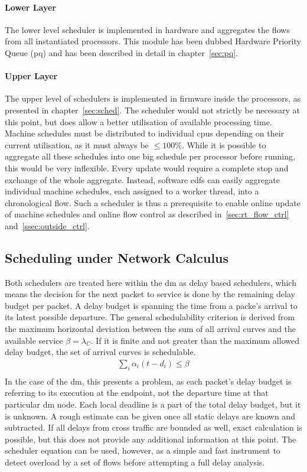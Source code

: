 \paragraph{Lower Layer}
The lower level scheduler is implemented in hardware and aggregates the flows from all instantiated processors.
This module has been dubbed Hardware Priority Queue (\gls{pq}) and has been described in detail in chapter~\ref{sec:pq}.
\paragraph{Upper Layer}
The upper level of schedulers is implemented in firmware inside the processors, as presented in chapter~\ref{sec:sched}.
The scheduler would not strictly be necessary at this point, but does allow a better utilisation of available processing time.
Machine schedules must be distributed to individual \gls{cpu}s depending on their current utilisation, as it must always
be $\le 100\%$. While it is possible to aggregate all these schedules into one big schedule per processor before running,
this would be very inflexible. Every update would require a complete stop and exchange of the whole aggregate. 
Instead, software \gls{edf}s can easily aggregate individual machine schedules, each assigned to a worker thread, into a chronological flow.
Such a scheduler is thus a prerequisite to enable online update of machine schedules and online flow control as described in~\ref{sec:rt_flow_ctrl} and~\ref{ssec:outside_ctrl}. 

\subsection{Scheduling under Network Calculus}
Both schedulers are treated here within the \gls{dm} as delay based schedulers, which means the decision for the next packet to service is done
by the remaining delay budget per packet. A delay budget is spanning the time from a packe's arrival to its latest possible departure.
The general schedulability criterion is derived from the maximum horizontal deviation between the sum of all arrival curves and the available service $\beta = \lambda_C$.
If it is finite and not greater than the maximum allowed delay budget, the set of arrival curves is schedulable.
%
\begin{equation}
\begin{aligned}
\sum_i \alpha_i(t-d_i) \le \beta\\
\label{eq:min_d}
\end{aligned}
\end{equation}
%
In the case of the \gls{dm}, this presents a problem, as each packet's delay budget is referring to its execution at the endpoint, not the departure time at that particular \gls{dm} node.
Each local deadline is a part of the total delay budget, but it is unknown. A rough estimate can be given once all static delays are known and subtracted. If all delays from cross traffic
are bounded as well, exact calculation is possible, but this does not provide any additional information at this point. The scheduler equation can be used, however, as a simple and fast instrument to detect overload
by a set of flows before attempting a full delay analysis.

